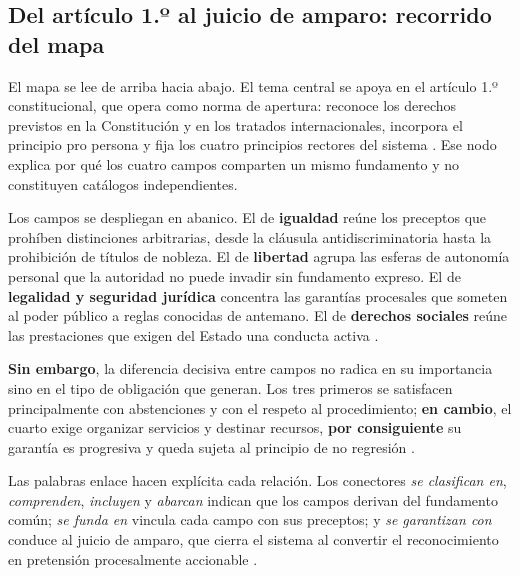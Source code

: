 \documentclass[
  spanish,
  letterpaper, oneside
]{article}
\begin{document}
\begin{landscape}
\begin{center}
{\begin{tikzpicture}[node distance=0.55cm and 0.9cm]
\end{tikzpicture}}
\end{center}


\end{landscape}

\subsection{Del artículo 1.º al juicio de amparo: recorrido del mapa}

El mapa se lee de arriba hacia abajo. El tema central se apoya en el artículo 1.º constitucional, que opera como norma de apertura: reconoce los derechos previstos en la Constitución y en los tratados internacionales, incorpora el principio pro persona y fija los cuatro principios rectores del sistema \citep{cpeum2026}. Ese nodo explica por qué los cuatro campos comparten un mismo fundamento y no constituyen catálogos independientes.

Los campos se despliegan en abanico. El de \textbf{igualdad} reúne los preceptos que prohíben distinciones arbitrarias, desde la cláusula antidiscriminatoria hasta la prohibición de títulos de nobleza. El de \textbf{libertad} agrupa las esferas de autonomía personal que la autoridad no puede invadir sin fundamento expreso. El de \textbf{legalidad y seguridad jurídica} concentra las garantías procesales que someten al poder público a reglas conocidas de antemano. El de \textbf{derechos sociales} reúne las prestaciones que exigen del Estado una conducta activa \citep{cndhCualesDerechos2026}.

\textbf{Sin embargo}, la diferencia decisiva entre campos no radica en su importancia sino en el tipo de obligación que generan. Los tres primeros se satisfacen principalmente con abstenciones y con el respeto al procedimiento; \textbf{en cambio}, el cuarto exige organizar servicios y destinar recursos, \textbf{por consiguiente} su garantía es progresiva y queda sujeta al principio de no regresión \citep{alvarezIcazaDerechosMexico}.

Las palabras enlace hacen explícita cada relación. Los conectores \emph{se clasifican en}, \emph{comprenden}, \emph{incluyen} y \emph{abarcan} indican que los campos derivan del fundamento común; \emph{se funda en} vincula cada campo con sus preceptos; y \emph{se garantizan con} conduce al juicio de amparo, que cierra el sistema al convertir el reconocimiento en pretensión procesalmente accionable \citep{marcanoSalazarDerechosHumanos}.
\end{document}
